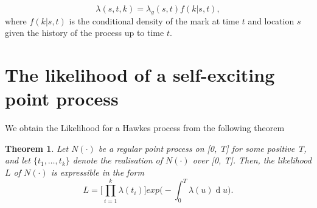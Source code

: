 \documentclass[11pt,a4paper]{article}
\renewcommand{\d}[1]{\ensuremath{\operatorname{d}\!{#1}}}
\newtheorem{theorem}{Theorem}[section]
\begin{document}
\begin{equation*}
    \lambda(s, t, k) = \lambda_g(s, t)f(k | s, t),
\end{equation*}
where $f(k | s, t)$ is the conditional density of the mark at time $t$ and location $s$ given the history of the process up to time $t$.

\section{The likelihood of a self-exciting point process}

We obtain the Likelihood for a Hawkes process from the following theorem {\color{missing a little introduction parhaps?}}

\begin{theorem}
    Let $N(\cdot)$ be a regular point process on [0, T] for some positive T, and let $\{ t_1, \dots, t_k \}$ denote the realisation of $N(\cdot)$ over [0, T]. Then, the likelihood $L$ of $N(\cdot)$ is expressible in the form
    \begin{equation*}
        L = \Bigg [ \prod_{i=1}^k \lambda(t_i) \Bigg] exp \Bigg( - \int_0^T \lambda(u) \d u \Bigg).
    \end{equation*}
\end{theorem}
\end{document}
